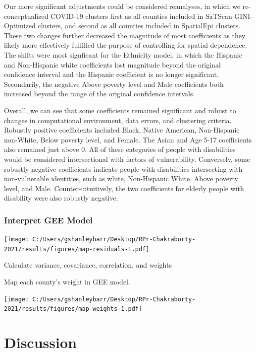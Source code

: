 \documentclass[
]{article}
\begin{document}
Our more significant adjustments could be considered reanalyses, in
which we re-conceptualized COVID-19 clusters first as all counties
included in SaTScan GINI-Optimized clusters, and second as all counties
included in SpatialEpi clusters. These two changes further decreased the
magnitude of most coefficients as they likely more effectively fulfilled
the purpose of controlling for spatial dependence. The shifts were most
signficant for the Ethnicity model, in which the Hispanic and
Non-Hispanic white coefficients lost magnitude beyond the original
confidence interval and the Hispanic coefficient is no longer
significant. Secondarily, the negative Above poverty level and Male
coefficients both increased beyond the range of the original confidence
intervals.

Overall, we can see that some coefficients remained significant and
robust to changes in computational environment, data errors, and
clustering criteria. Robustly positive coefficients included Black,
Native American, Non-Hispanic non-White, Below poverty level, and
Female. The Asian and Age 5-17 coefficients also remained just above 0.
All of these categories of people with disabilities would be considered
intersectional with factors of vulnerability. Conversely, some robustly
negative coefficients indicate people with disabilities intersecting
with non-vulnerable identities, such as white, Non-Hispanic White, Above
poverty level, and Male. Counter-intuitively, the two coefficients for
elderly people with disability were also robustly negative.

\hypertarget{interpret-gee-model}{%
\subsubsection{Interpret GEE Model}\label{interpret-gee-model}}

\texttt{[image: C:/Users/gshanleybarr/Desktop/RPr-Chakraborty-2021/results/figures/map-residuals-1.pdf]}

Calculate variance, covariance, correlation, and weights

Map each county's weight in GEE model.

\texttt{[image: C:/Users/gshanleybarr/Desktop/RPr-Chakraborty-2021/results/figures/map-weights-1.pdf]}

\hypertarget{discussion}{%
\section{Discussion}\label{discussion}}
\end{document}
